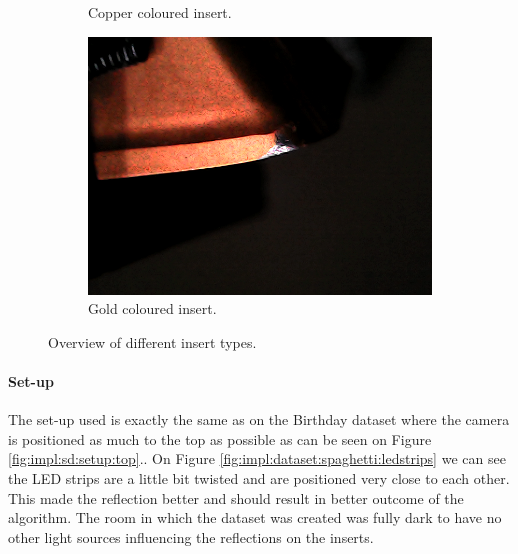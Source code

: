 \begin{figure}[hbtp]
\begin{subfigure}{0.31\textwidth}
		\caption{Copper coloured insert.}
		\label{fig:impl:datasets:spaghetti:copper}
	\end{subfigure}
	\hspace*{\fill}
	\begin{subfigure}{0.31\textwidth}
		\includegraphics[width=\linewidth, keepaspectratio=true]{./fig/Vision/Dataset/automated_datasets/2_created_datasets/2_Spaghetti_dataset/rounded_gold_b_015_p_006_l_006-011_white_nb.png}
		\caption{Gold coloured insert.}
		\label{fig:impl:datasets:spaghetti:gold}
	\end{subfigure}
	\hspace*{\fill}
	\caption{Overview of different insert types.}
	\label{fig:impl:datasets:spaghetti:types}
\end{figure}

\paragraph{Set-up}

The set-up used is exactly the same as on the Birthday dataset where the camera is positioned as much to the top as possible as can be seen on Figure \ref{fig:impl:sd:setup:top}..
On Figure \ref{fig:impl:dataset:spaghetti:ledstrips} we can see the LED strips are a little bit twisted and are positioned very close to each other. This made the reflection better and should result in better outcome of the algorithm. The room in which the dataset was created was fully dark to have no other light sources influencing the reflections on the inserts.

